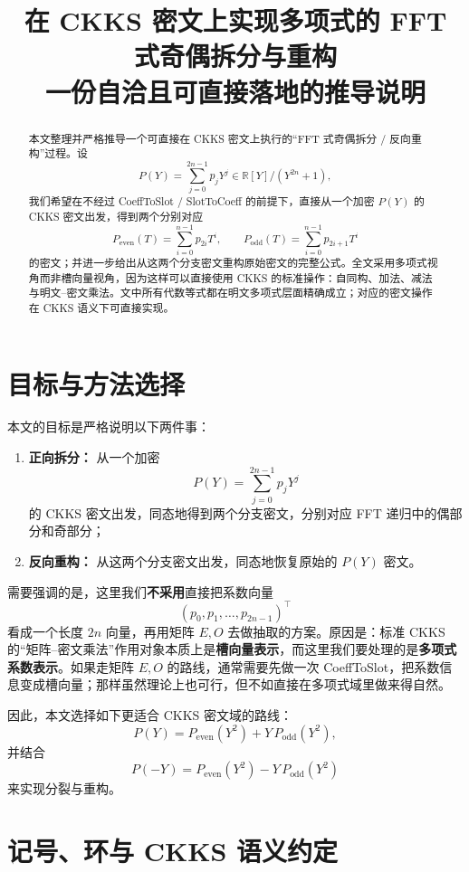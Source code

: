 \documentclass[11pt,a4paper]{ctexart}
\title{在 CKKS 密文上实现多项式的 FFT 式奇偶拆分与重构\\
\large 一份自洽且可直接落地的推导说明}
\author{}
\date{}
\newcommand{\RR}{\mathbb{R}}
\begin{document}
\maketitle


\tableofcontents
\newpage


\begin{abstract}
本文整理并严格推导一个可直接在 CKKS 密文上执行的“FFT 式奇偶拆分 / 反向重构”过程。设
\[
P(Y)=\sum_{j=0}^{2n-1}p_jY^j \in \RR[Y]/(Y^{2n}+1),
\]
我们希望在不经过 CoeffToSlot / SlotToCoeff 的前提下，直接从一个加密 \(P(Y)\) 的 CKKS 密文出发，得到两个分别对应
\[
P_{\mathrm{even}}(T)=\sum_{i=0}^{n-1}p_{2i}T^i,
\qquad
P_{\mathrm{odd}}(T)=\sum_{i=0}^{n-1}p_{2i+1}T^i
\]
的密文；并进一步给出从这两个分支密文重构原始密文的完整公式。全文采用多项式视角而非槽向量视角，因为这样可以直接使用 CKKS 的标准操作：自同构、加法、减法与明文--密文乘法。文中所有代数等式都在明文多项式层面精确成立；对应的密文操作在 CKKS 语义下可直接实现。
\end{abstract}

\section{目标与方法选择}

本文的目标是严格说明以下两件事：

\begin{enumerate}[label=\arabic*.]
    \item \textbf{正向拆分：} 从一个加密
    \[
    P(Y)=\sum_{j=0}^{2n-1}p_jY^j
    \]
    的 CKKS 密文出发，同态地得到两个分支密文，分别对应 FFT 递归中的偶部分和奇部分；
    
    \item \textbf{反向重构：} 从这两个分支密文出发，同态地恢复原始的 \(P(Y)\) 密文。
\end{enumerate}

需要强调的是，这里我们\textbf{不采用}直接把系数向量
\[
(p_0,p_1,\dots,p_{2n-1})^\top
\]
看成一个长度 \(2n\) 向量，再用矩阵 \(E,O\) 去做抽取的方案。原因是：标准 CKKS 的“矩阵--密文乘法”作用对象本质上是\textbf{槽向量表示}，而这里我们要处理的是\textbf{多项式系数表示}。如果走矩阵 \(E,O\) 的路线，通常需要先做一次 CoeffToSlot，把系数信息变成槽向量；那样虽然理论上也可行，但不如直接在多项式域里做来得自然。

因此，本文选择如下更适合 CKKS 密文域的路线：
\[
P(Y)=P_{\mathrm{even}}(Y^2)+Y\,P_{\mathrm{odd}}(Y^2),
\]
并结合
\[
P(-Y)=P_{\mathrm{even}}(Y^2)-Y\,P_{\mathrm{odd}}(Y^2)
\]
来实现分裂与重构。

\section{记号、环与 CKKS 语义约定}
\end{document}
